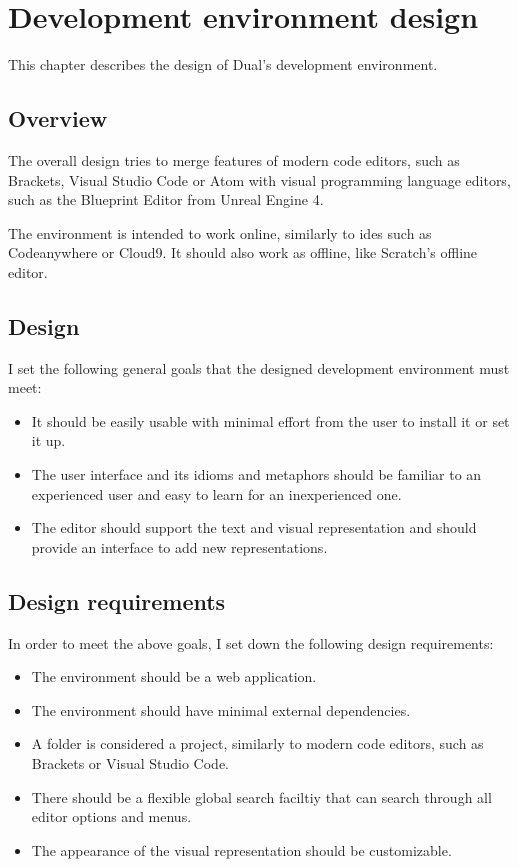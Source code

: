 \chapter{Development environment design}\label{chap:editor}
This chapter describes the design of Dual's development environment.

\section{Overview}
The overall design tries to merge features of modern code editors, such as Brackets\cite{brackets_site}, Visual Studio Code\cite{vscode_site} or Atom\cite{atom_site} with visual programming language editors, such as the Blueprint Editor from Unreal Engine 4\cite{blueprint_editor}.

The environment is intended to work online, similarly to \acrlong{ide}s such as Codeanywhere\cite{codeanywhere_website} or Cloud9\cite{c9_website}. It should also work as offline, like Scratch's offline editor\cite{scratch_offline}.

\section{Design}

I set the following general goals that the designed development environment must meet:
\begin{itemize}
\item It should be easily usable with minimal effort from the user to install it or set it up.
\item The user interface and its idioms and metaphors\cite{ui_idioms} should be familiar to an experienced user and easy to learn for an inexperienced one.
\item The editor should support the text and visual representation and should provide an interface to add new representations.
\end{itemize}

\section{Design requirements}
In order to meet the above goals, I set down the following design requirements:
\begin{itemize}
\item The environment should be a web application.
\item The environment should have minimal external dependencies.
\item A folder is considered a project, similarly to modern code editors, such as Brackets or Visual Studio Code.
\item There should be a flexible global search faciltiy that can search through all editor options and menus.
\item The appearance of the visual representation should be customizable.
\end{itemize}

